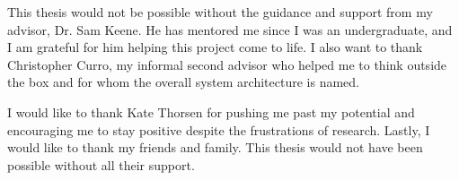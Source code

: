 This thesis would not be possible without the guidance and support from my advisor, Dr. Sam Keene. He has mentored me since I was an undergraduate, and I am grateful for him helping this project come to life. I also want to thank Christopher Curro, my informal second advisor who helped me to think outside the box and for whom the overall system architecture is named.

I would like to thank Kate Thorsen for pushing me past my potential and encouraging me to stay positive despite the frustrations of research. Lastly, I would like to thank my friends and family. This thesis would not have been possible without all their support.
